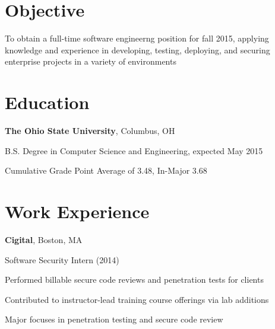 \documentclass[letterpaper]{resume}
\begin{document}
\author{Christopher John Wallace}
\maketitle

\section{Objective}
\begin{compactitem}
\item
	To obtain a full-time software engineerng position for fall 2015, applying
	knowledge and experience in developing, testing, deploying, and securing
	enterprise projects in a variety of environments
\end{compactitem}

\section{Education}
\textbf{The Ohio State University}, Columbus, OH

\begin{compactitem}
\item B.S. Degree in Computer Science and Engineering, expected May 2015
\item Cumulative Grade Point Average of 3.48, In-Major 3.68
\end{compactitem}

\section{Work Experience}
\textbf{Cigital}, Boston, MA

Software Security Intern (2014)
\begin{compactitem}
\item Performed billable secure code reviews and penetration tests for clients

\item Contributed to instructor-lead training course offerings via lab
	additions

\item Major focuses in penetration testing and secure code review

\end{compactitem}

~
\end{document}
